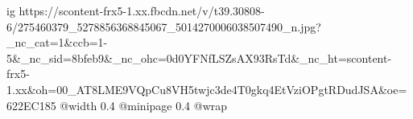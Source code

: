  
 
 
 
 

\ifcmt
  ig https://scontent-frx5-1.xx.fbcdn.net/v/t39.30808-6/275460379_5278856368845067_5014270006038507490_n.jpg?_nc_cat=1&ccb=1-5&_nc_sid=8bfeb9&_nc_ohc=0d0YFNfLSZsAX93RsTd&_nc_ht=scontent-frx5-1.xx&oh=00_AT8LME9VQpCu8VH5twjc3de4T0gkq4EtVziOPgtRDudJSA&oe=622EC185
  @width 0.4
  @minipage 0.4
  @wrap \parpic[r]
\fi
